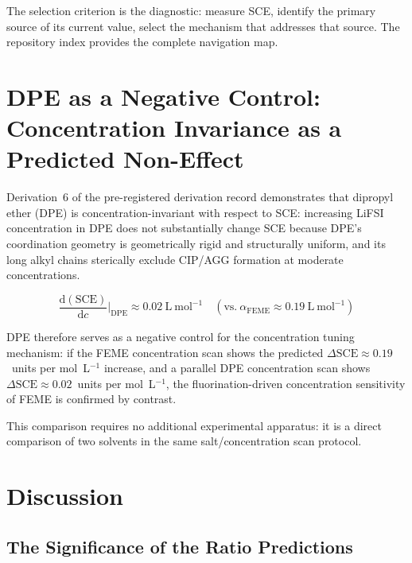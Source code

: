 \documentclass[11pt]{article}
\theoremstyle{plain}
\theoremstyle{definition}
\theoremstyle{remark}
\begin{document}
The selection criterion is the diagnostic: measure SCE, identify the
primary source of its current value, select the mechanism that
addresses that source.  The repository index provides the complete
navigation map.

\section{DPE as a Negative Control: Concentration Invariance as a
Predicted Non-Effect}
\label{sec:DPE_control}

Derivation~6 of the pre-registered derivation record demonstrates
that dipropyl ether (DPE) is concentration-invariant with respect to
SCE: increasing LiFSI concentration in DPE does not substantially
change SCE because DPE's coordination geometry is geometrically
rigid and structurally uniform, and its long alkyl chains sterically
exclude CIP/AGG formation at moderate concentrations.

\begin{equation}
  \frac{\mathrm{d}(\mathrm{SCE})}{\mathrm{d}c}\bigg|_{\mathrm{DPE}}
  \approx 0.02~\mathrm{L~mol}^{-1} \quad
  (\mathrm{vs.}\ \alpha_\mathrm{FEME} \approx 0.19~\mathrm{L~mol}^{-1})
  \label{eq:DPE_invariance}
\end{equation}

DPE therefore serves as a negative control for the concentration
tuning mechanism: if the FEME concentration scan shows the predicted
$\Delta\mathrm{SCE} \approx 0.19$~units per mol~L$^{-1}$ increase,
and a parallel DPE concentration scan shows $\Delta\mathrm{SCE}
\approx 0.02$~units per mol~L$^{-1}$, the fluorination-driven
concentration sensitivity of FEME is confirmed by contrast.

This comparison requires no additional experimental apparatus: it is
a direct comparison of two solvents in the same salt/concentration
scan protocol.

\section{Discussion}

\subsection{The Significance of the Ratio Predictions}
\end{document}
